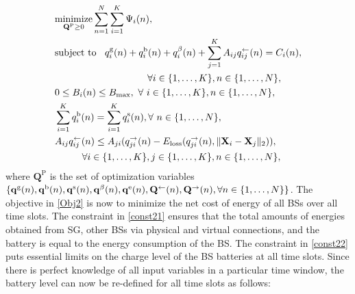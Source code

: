 \documentclass[10pt, letter,twocolumn]{IEEEtran}
\begin{document}
\vspace{-0.0in}
\small
\begin{align}
& \underset{ \mathbf{Q}^{\text{P}}\geq 0 }{\text{minimize}} \sum \limits_{n=1}^{N} \sum \limits_{i=1}^{K} \Psi_{i}(n), \label{Obj2}\\
& \text{subject to } \;\; q_{i}^{\text{g}}(n) + q_{i}^{\text{b}}(n) + q_{i}^{\beta}(n) + \sum \limits^{K}_{j=1} A_{ij}q^{\leftarrow}_{ij}(n) = C_{i}(n), \notag \\
&\hspace{3.4cm} \forall i \in \{1, \ldots, K \}, n \in \{1,\ldots,N\},\label{const21}\\
& 0 \leq B_{i}(n) \leq B_{\max},\ \forall \ i \in \{1,\ldots,K\},n \in \{1,\ldots,N\},\label{const22}\\
&\sum \limits_{i=1}^{K} q_{i}^{\text{b}}(n) = \sum \limits_{i=1}^{K} q_{i}^{\text{s}}(n), \forall \ n \in \{1,\ldots,N\},\label{const23} \\
& A_{ij}q^{\leftarrow}_{ij}(n) \leq  A_{ji}(q^{\rightarrow}_{ji}(n) -  E_{\text{loss}}(q^{\rightarrow}_{ji}(n), \|\mathbf{X}_{i} - \mathbf{X}_{j}\|_{2}) ), \notag \\
 & \hspace{1cm}\forall i \in \{1, \ldots,K\},j \in \{1,\ldots,K\}, n\in \{1,\ldots,N\}, \label{const24}
\end{align}\normalsize
where $\mathbf{Q}^{\text{P}}$ is the set of optimization variables $\{ \mathbf{q}^{\text{g}}(n), \mathbf{q}^{\text{b}}(n), \mathbf{q}^{\text{s}}(n), \mathbf{q}^{\beta}(n), \mathbf{q}^{\text{e}}(n), \mathbf{Q}^{\leftarrow}(n), \mathbf{Q}^{\rightarrow}(n),\\ \forall n \in \{1, \ldots, N \}  \}$.
The objective in \eqref{Obj2} is now to minimize the net cost of energy of all BSs over all time slots. The constraint in \eqref{const21} ensures that the total amounts of energies obtained from SG, other BSs via physical and virtual connections, and the battery is equal to the energy consumption of the BS. The constraint in \eqref{const22} puts essential limits on the charge level of the BS batteries at all time slots. Since there is perfect knowledge of all input variables in a particular time window, the battery level can now be re-defined for all time slots as follows:
\vspace{-0.0cm}
\end{document}
